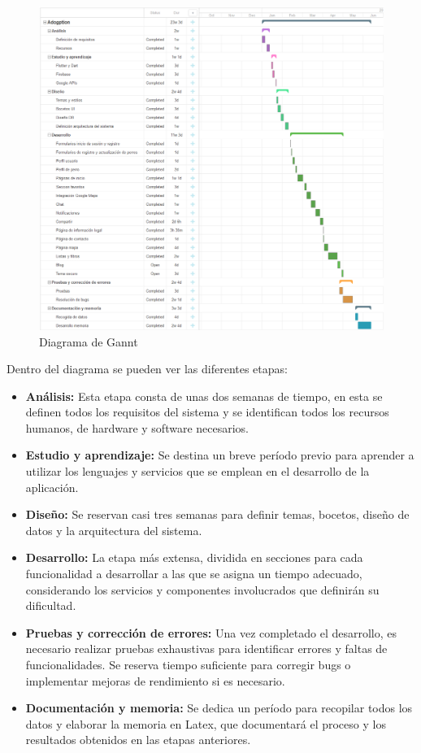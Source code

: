 \documentclass[a4paper, 12pt]{article}
\begin{document}
\begin{figure}[H]
	{\includegraphics[width=15cm]{GanntSmall2.png}\par}
	\caption{Diagrama de Gannt}
\end{figure}

Dentro del diagrama se pueden ver las diferentes etapas:
\begin{itemize}[noitemsep]
	\item \textbf{Análisis:} Esta etapa consta de unas dos semanas de tiempo, en esta se definen todos los requisitos del sistema y se identifican todos los recursos humanos, de hardware y software necesarios. 
	\item \textbf{Estudio y aprendizaje:} Se destina un breve período previo para aprender a utilizar los lenguajes y servicios que se emplean en el desarrollo de la aplicación.
	\item \textbf{Diseño:} Se reservan casi tres semanas para definir temas, bocetos, diseño de datos y la arquitectura del sistema.
	\item \textbf{Desarrollo:} La etapa más extensa, dividida en secciones para cada funcionalidad a desarrollar a las que se asigna un tiempo adecuado, considerando los servicios y componentes involucrados que definirán su dificultad.
	\item \textbf{Pruebas y corrección de errores:} Una vez completado el desarrollo, es necesario realizar pruebas exhaustivas para identificar errores y faltas de funcionalidades. Se reserva tiempo suficiente para corregir bugs o implementar mejoras de rendimiento si es necesario.
	\item \textbf{Documentación y memoria:} Se dedica un período para recopilar todos los datos y elaborar la memoria en Latex, que documentará el proceso y los resultados obtenidos en las etapas anteriores.
\end{itemize}
\end{document}
